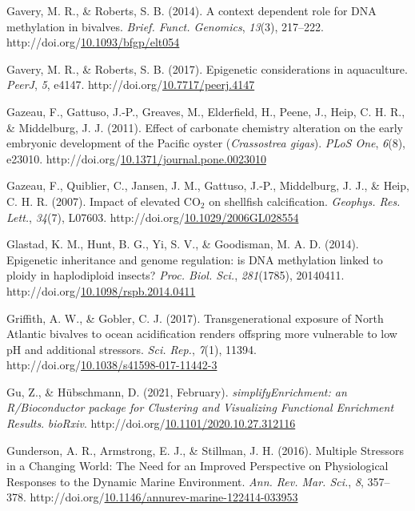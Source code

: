 \documentclass [11pt, proquest] {uwthesis}[2015/03/03]
\newlength{\cslhangindent}
\newenvironment{CSLReferences}%
{\setlength{\parindent}{0pt}%
\everypar{\setlength{\hangindent}{\cslhangindent}}\ignorespaces}%
{\par}
\begin{document}
\begin{CSLReferences}{1}{0}
\leavevmode\hypertarget{ref-Gavery2014}{}%
Gavery, M. R., \& Roberts, S. B. (2014). {A context dependent role for DNA methylation in bivalves}. \emph{Brief. Funct. Genomics}, \emph{13}(3), 217--222. http://doi.org/\href{https://doi.org/10.1093/bfgp/elt054}{10.1093/bfgp/elt054}

\leavevmode\hypertarget{ref-Gavery2017}{}%
Gavery, M. R., \& Roberts, S. B. (2017). {Epigenetic considerations in aquaculture}. \emph{PeerJ}, \emph{5}, e4147. http://doi.org/\href{https://doi.org/10.7717/peerj.4147}{10.7717/peerj.4147}

\leavevmode\hypertarget{ref-Gazeau2011}{}%
Gazeau, F., Gattuso, J.-P., Greaves, M., Elderfield, H., Peene, J., Heip, C. H. R., \& Middelburg, J. J. (2011). {Effect of carbonate chemistry alteration on the early embryonic development of the Pacific oyster (\emph{Crassostrea gigas})}. \emph{PLoS One}, \emph{6}(8), e23010. http://doi.org/\href{https://doi.org/10.1371/journal.pone.0023010}{10.1371/journal.pone.0023010}

\leavevmode\hypertarget{ref-Gazeau2007}{}%
Gazeau, F., Quiblier, C., Jansen, J. M., Gattuso, J.-P., Middelburg, J. J., \& Heip, C. H. R. (2007). {Impact of elevated {CO\(_2\)} on shellfish calcification}. \emph{Geophys. Res. Lett.}, \emph{34}(7), L07603. http://doi.org/\href{https://doi.org/10.1029/2006GL028554}{10.1029/2006GL028554}

\leavevmode\hypertarget{ref-Glastad2014}{}%
Glastad, K. M., Hunt, B. G., Yi, S. V., \& Goodisman, M. A. D. (2014). {Epigenetic inheritance and genome regulation: is DNA methylation linked to ploidy in haplodiploid insects?} \emph{Proc. Biol. Sci.}, \emph{281}(1785), 20140411. http://doi.org/\href{https://doi.org/10.1098/rspb.2014.0411}{10.1098/rspb.2014.0411}

\leavevmode\hypertarget{ref-Griffith2017}{}%
Griffith, A. W., \& Gobler, C. J. (2017). {Transgenerational exposure of North Atlantic bivalves to ocean acidification renders offspring more vulnerable to low pH and additional stressors}. \emph{Sci. Rep.}, \emph{7}(1), 11394. http://doi.org/\href{https://doi.org/10.1038/s41598-017-11442-3}{10.1038/s41598-017-11442-3}

\leavevmode\hypertarget{ref-Gu2021}{}%
Gu, Z., \& Hübschmann, D. (2021, February). \emph{{simplifyEnrichment: an R/Bioconductor package for Clustering and Visualizing Functional Enrichment Results}}. \emph{bioRxiv}. http://doi.org/\href{https://doi.org/10.1101/2020.10.27.312116}{10.1101/2020.10.27.312116}

\leavevmode\hypertarget{ref-Gunderson2016}{}%
Gunderson, A. R., Armstrong, E. J., \& Stillman, J. H. (2016). {Multiple Stressors in a Changing World: The Need for an Improved Perspective on Physiological Responses to the Dynamic Marine Environment}. \emph{Ann. Rev. Mar. Sci.}, \emph{8}, 357--378. http://doi.org/\href{https://doi.org/10.1146/annurev-marine-122414-033953}{10.1146/annurev-marine-122414-033953}


\end{CSLReferences}
\end{document}
